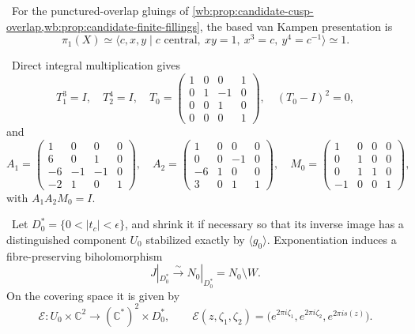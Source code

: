 
\begin{proposition}
\label{mapsI:top:prop:geometric-pi1}
\ For the punctured-overlap gluings of
\cref{wb:prop:candidate-cusp-overlap,wb:prop:candidate-finite-fillings}, the based
van Kampen presentation is
\[
 \pi_1(X)\simeq
 \langle c,x,y\mid c\text{ central},\ xy=1,\ x^3=c,\ y^4=c^{-1}\rangle
 \simeq1.
\tag{IL.5.24}
\]
\end{proposition}

\begin{proposition}\label{wb:prop:monodromy-certificate}
\ Direct integral multiplication gives
\[
T_1^3=I,\quad T_2^4=I,\quad
T_0=
\begin{pmatrix}
1&0&0&1\\0&1&-1&0\\0&0&1&0\\0&0&0&1
\end{pmatrix},
\quad (T_0-I)^2=0,
\]
and
\[
A_1=
\begin{pmatrix}
1&0&0&0\\6&0&1&0\\-6&-1&-1&0\\-2&1&0&1
\end{pmatrix},
\quad
A_2=
\begin{pmatrix}
1&0&0&0\\0&0&-1&0\\-6&1&0&0\\3&0&1&1
\end{pmatrix},
\quad
M_0=
\begin{pmatrix}
1&0&0&0\\0&1&0&0\\0&1&1&0\\-1&0&0&1
\end{pmatrix},
\]
with $A_1A_2M_0=I$.
\end{proposition}

\begin{proposition}
\label{wb:prop:candidate-cusp-overlap}
\ Let \(D_0^*=\{0<|t_c|<\epsilon\}\), and shrink it if necessary
so that its inverse image has a distinguished component \(U_0\) stabilized
exactly by \(\langle g_0\rangle\).  Exponentiation induces a
fibre-preserving biholomorphism
\[
 J|_{D_0^*}\xrightarrow{\ \sim\ }
 N_0|_{D_0^*}=N_0\setminus W.
\tag{2.8i}
\]
On the covering space it is given by
\[
 \mathcal E:U_0\times\mathbb C^2\longrightarrow
             (\mathbb C^*)^2\times D_0^*,
 \qquad
 \mathcal E(z,\zeta_1,\zeta_2)
 =\bigl(e^{2\pi i\zeta_1},e^{2\pi i\zeta_2},e^{2\pi is(z)}\bigr).
\tag{2.8ii}
\]
\end{proposition}


